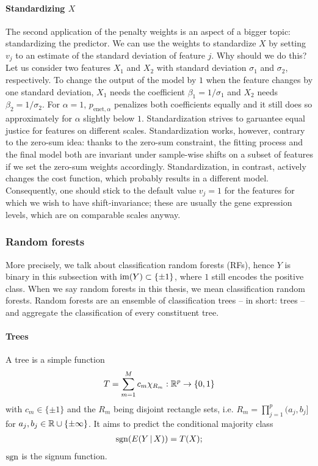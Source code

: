 \paragraph{Standardizing $X$} 
The second application of the penalty weights is an aspect of a bigger topic: standardizing the
predictor. We can use the weights to standardize $X$ by setting $v_j$ to an estimate of the standard 
deviation of feature $j$. Why 
should we do this? Let us consider two features $X_1$ and $X_2$ with standard deviation $\sigma_1$
and $\sigma_2$, respectively. To change the output of the model by $1$ when the feature changes by 
one standard deviation, $X_1$ needs the coefficient $\beta_1 = 1/\sigma_1$ and $X_2$ needs 
$\beta_2 = 1/\sigma_2$. For $\alpha = 1$, $p_{\text{enet}, \alpha}$ penalizes both coefficients 
equally and it still does so approximately for $\alpha$ slightly below $1$. Standardization strives 
to garuantee equal justice for features on different scales.
Standardization works, however, contrary to the zero-sum idea: thanks to the zero-sum constraint, 
the fitting process and the final model both are invariant under sample-wise shifts on a subset of 
features if we set the zero-sum weights accordingly. Standardization, in contrast, actively changes 
the cost function, which probably results in a different model. Consequently, one should stick to 
the default value $v_j = 1$ for the features for which we wish to have shift-invariance; these 
are usually the gene expression levels, which are on comparable scales anyway.

\subsubsection{Random forests}

More precisely, we talk about classification random forests (RFs), hence $Y$ is binary in this subsection 
with $\mathrm{im}(Y) \subset \{ \pm 1 \}$, where $1$ still encodes the positive class. When we say random 
forests in this thesis, we mean classification 
random forests. Random forests are an ensemble of classification trees -- in short: 
trees -- and aggregate the classification of every constituent tree.

\paragraph{Trees}
A tree is a simple function
\begin{align}
    T = \sum_{m=1}^M c_m \chi_{R_m}: \mathbb{R}^p \to \{0, 1\}
\end{align}
with $c_m \in \{\pm 1\}$ and the $R_m$ being disjoint rectangle sets, i.e. $R_m = \prod_{j=1}^p 
(a_j, b_j]$ for $a_j, b_j \in \mathbb{R} \cup \{ \pm \infty \}$. It aims to predict the conditional 
majority class 
\begin{align}\label{eq:rf-major}
    \mathrm{sgn}(E(Y \,|\, X)) = T(X);
\end{align}
$\mathrm{sgn}$ is the signum function.

